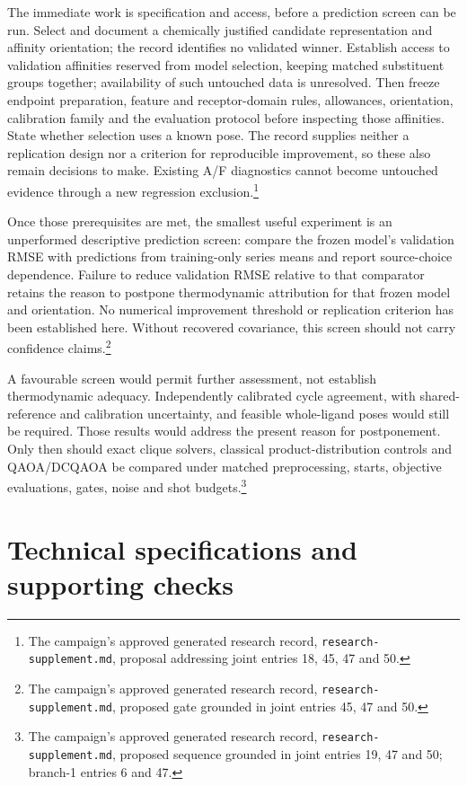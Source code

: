 \documentclass{article}
\newcommand{\rr}[1]{\footnote{The campaign's approved generated research record, \texttt{research-supplement.md}, #1.}}
\begin{document}
The immediate work is specification and access, before a prediction screen can be run. Select and document a chemically justified candidate representation and affinity orientation; the record identifies no validated winner. Establish access to validation affinities reserved from model selection, keeping matched substituent groups together; availability of such untouched data is unresolved. Then freeze endpoint preparation, feature and receptor-domain rules, allowances, orientation, calibration family and the evaluation protocol before inspecting those affinities. State whether selection uses a known pose. The record supplies neither a replication design nor a criterion for reproducible improvement, so these also remain decisions to make. Existing A/F diagnostics cannot become untouched evidence through a new regression exclusion.\rr{proposal addressing joint entries 18, 45, 47 and 50}

Once those prerequisites are met, the smallest useful experiment is an unperformed descriptive prediction screen: compare the frozen model's validation RMSE with predictions from training-only series means and report source-choice dependence. Failure to reduce validation RMSE relative to that comparator retains the reason to postpone thermodynamic attribution for that frozen model and orientation. No numerical improvement threshold or replication criterion has been established here. Without recovered covariance, this screen should not carry confidence claims.\rr{proposed gate grounded in joint entries 45, 47 and 50}

A favourable screen would permit further assessment, not establish thermodynamic adequacy. Independently calibrated cycle agreement, with shared-reference and calibration uncertainty, and feasible whole-ligand poses would still be required. Those results would address the present reason for postponement. Only then should exact clique solvers, classical product-distribution controls and QAOA/DCQAOA be compared under matched preprocessing, starts, objective evaluations, gates, noise and shot budgets.\rr{proposed sequence grounded in joint entries 19, 47 and 50; branch-1 entries 6 and 47}

\appendix
\section{Technical specifications and supporting checks}
\end{document}

